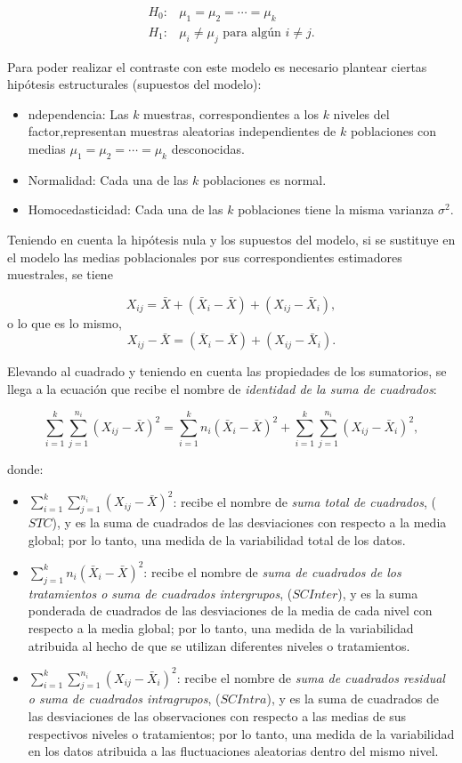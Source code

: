 \documentclass[
  spanish,
  a4paper,
]{scrreport}
\providecommand{\tightlist}{%
  \setlength{\itemsep}{0pt}\setlength{\parskip}{0pt}}
\theoremstyle{plain}
\theoremstyle{definition}
\theoremstyle{definition}
\theoremstyle{remark}
\begin{document}
\begin{align*}
H_0: & \mu_1 = \mu_2  = \cdots = \mu _k\\
H_1: & \mu_i \neq \mu_j \textrm{ para algún } i\neq j.
\end{align*}

Para poder realizar el contraste con este modelo es necesario plantear
ciertas hipótesis estructurales (supuestos del modelo):

\begin{itemize}
\tightlist
\item
  ndependencia: Las \(k\) muestras, correspondientes a los \(k\) niveles
  del factor,representan muestras aleatorias independientes de \(k\)
  poblaciones con medias \(\mu_1  = \mu_2  = \cdots = \mu_k\)
  desconocidas.
\item
  Normalidad: Cada una de las \(k\) poblaciones es normal.
\item
  Homocedasticidad: Cada una de las \(k\) poblaciones tiene la misma
  varianza \(\sigma^2\).
\end{itemize}

Teniendo en cuenta la hipótesis nula y los supuestos del modelo, si se
sustituye en el modelo las medias poblacionales por sus correspondientes
estimadores muestrales, se tiene

\[
X_{ij} = \bar X+(\bar X_i-\bar X)+(X_{ij}-\bar X_i),\] o lo que es lo
mismo, \[X_{ij}-\bar X= (\bar X_i-\bar X)+(X_{ij}-\bar X_i).
\]

Elevando al cuadrado y teniendo en cuenta las propiedades de los
sumatorios, se llega a la ecuación que recibe el nombre de
\emph{identidad de la suma de cuadrados}:

\[
\sum_{i=1}^k \sum_{j=1}^{n_i} (X_{ij}-\bar X)^2  = \sum_{i=1}^k n_i(\bar X_i-\bar X)^2 +\sum_{i=1}^k \sum_{j = 1}^{n_i}(X_{ij}-\bar X_i)^2,
\]

donde:

\begin{itemize}
\tightlist
\item
  \(\sum_{i=1}^k \sum_{j=1}^{n_i} (X_{ij}- \bar X)^2\): recibe el nombre
  de \emph{suma total de cuadrados}, (\(STC\)), y es la suma de
  cuadrados de las desviaciones con respecto a la media global; por lo
  tanto, una medida de la variabilidad total de los datos.
\item
  \(\sum_{j=1}^k n_i(\bar X_i-\bar X)^2\): recibe el nombre de
  \emph{suma de cuadrados de los tratamientos o suma de cuadrados
  intergrupos}, (\(SCInter\)), y es la suma ponderada de cuadrados de
  las desviaciones de la media de cada nivel con respecto a la media
  global; por lo tanto, una medida de la variabilidad atribuida al hecho
  de que se utilizan diferentes niveles o tratamientos.
\item
  \(\sum_{i=1}^k \sum_{j=1}^{n_i}(X_{ij}-\bar X_i )^2\): recibe el
  nombre de \emph{suma de cuadrados residual o suma de cuadrados
  intragrupos}, (\(SCIntra\)), y es la suma de cuadrados de las
  desviaciones de las observaciones con respecto a las medias de sus
  respectivos niveles o tratamientos; por lo tanto, una medida de la
  variabilidad en los datos atribuida a las fluctuaciones aleatorias
  dentro del mismo nivel.
\end{itemize}
\end{document}
